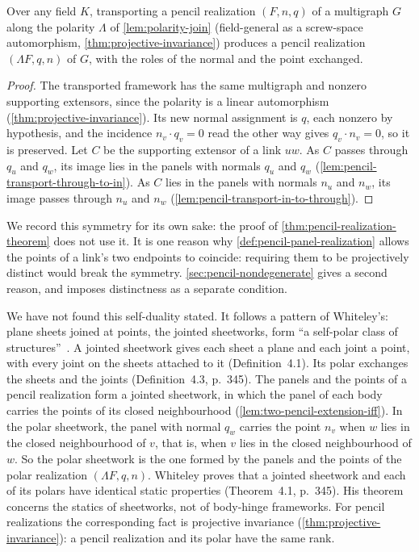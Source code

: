 \begin{lemma}
  \label{lem:pencil-self-dual}
  \leanok
  Over any field $K$, transporting a pencil realization $(F, n, q)$ of
  a multigraph $G$ along the polarity $\Lambda$ of
  \cref{lem:polarity-join} (field-general as a screw-space
  automorphism, \cref{thm:projective-invariance}) produces a pencil
  realization $(\Lambda F, q, n)$ of $G$, with the roles of the normal
  and the point exchanged.
\end{lemma}
\begin{proof}
  \leanok
  The transported framework has the same multigraph and nonzero
  supporting extensors, since the polarity is a linear automorphism
  (\cref{thm:projective-invariance}). Its new normal assignment is $q$,
  each nonzero by hypothesis, and the incidence $n_v \cdot q_v = 0$
  read the other way gives $q_v \cdot n_v = 0$, so it is preserved.
  Let $C$ be the supporting extensor of a link $uw$. As $C$ passes
  through $q_u$ and $q_w$, its image lies in the panels with normals
  $q_u$ and $q_w$ (\cref{lem:pencil-transport-through-to-in}). As $C$
  lies in the panels with normals $n_u$ and $n_w$, its image passes
  through $n_u$ and $n_w$ (\cref{lem:pencil-transport-in-to-through}).
\end{proof}

We record this symmetry for its own sake: the proof of
\cref{thm:pencil-realization-theorem} does not use it. It is one reason why
\cref{def:pencil-panel-realization} allows the points of a link's two
endpoints to coincide: requiring them to be projectively distinct would
break the symmetry. \cref{sec:pencil-nondegenerate} gives a second
reason, and imposes distinctness as a separate condition.

We have not found this self-duality stated. It follows a pattern of
Whiteley's: plane sheets joined at points, the jointed sheetworks, form
``a self-polar class of structures''~\cite[p.~344]{whiteley1987}. A
jointed sheetwork gives each sheet a plane and each joint a point, with
every joint on the sheets attached to it (Definition~4.1). Its polar
exchanges the sheets and the joints (Definition~4.3, p.~345). The panels
and the points of a pencil realization form a jointed sheetwork, in
which the panel of each body carries the points of its closed
neighbourhood (\cref{lem:two-pencil-extension-iff}). In the polar
sheetwork, the panel with normal $q_w$ carries the point $n_v$ when $w$
lies in the closed neighbourhood of $v$, that is, when $v$ lies in the
closed neighbourhood of $w$. So the polar sheetwork is the one formed by
the panels and the points of the polar realization $(\Lambda F, q, n)$.
Whiteley proves that a jointed sheetwork and each of its polars have
identical static properties (Theorem~4.1, p.~345). His theorem concerns the statics of
sheetworks, not of body-hinge frameworks. For pencil realizations the
corresponding fact is projective invariance
(\cref{thm:projective-invariance}): a pencil realization and its polar
have the same rank.


